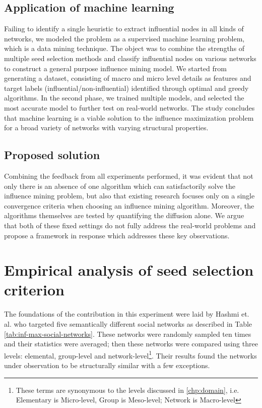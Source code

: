 		\subsection{Application of machine learning}
		Failing to identify a single heuristic to extract influential nodes in all kinds of networks, we modeled the problem as a supervised machine learning problem, which is a data mining technique. The object was to combine the strengths of multiple seed selection methods and classify influential nodes on various networks to construct a general purpose influence mining model. We started from generating a dataset, consisting of macro and micro level details as features and target labels (influential/non-influential) identified through optimal and greedy algorithms. In the second phase, we trained multiple models, and selected the most accurate model to further test on real-world networks. The study concludes that machine learning is a viable solution to the influence maximization problem for a broad variety of networks with varying structural properties.

		\subsection{Proposed solution}
		Combining the feedback from all experiments performed, it was evident that not only there is an absence of one algorithm which can satisfactorily solve the influence mining problem, but also that existing research focuses only on a single convergence criteria when choosing an influence mining algorithm. Moreover, the algorithms themselves are tested by quantifying the diffusion alone. We argue that both of these fixed settings do not fully address the real-world problems and propose a framework in response which addresses these key observations.


	\section{Empirical analysis of seed selection criterion}
	\label{sec:inf-max-seed-selection-analysis}
	The foundations of the contribution in this experiment were laid by Hashmi et. al. \cite{hashmi2012} who targeted five semantically different social networks as described in Table \ref{tab:inf-max-social-networks}. These networks were randomly sampled ten times and their statistics were averaged; then these networks were compared using three levels: elemental, group-level and network-level\footnote{These terms are synonymous to the levels discussed in \ref{chp:domain}, i.e. Elementary is Micro-level, Group is Meso-level; Network is Macro-level}. Their results found the networks under observation to be structurally similar with a few exceptions.
	
